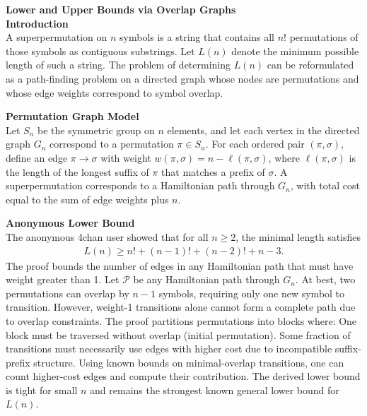 \begin{technical}
{\Large\textbf{Lower and Upper Bounds via Overlap Graphs}}\\

\noindent\textbf{Introduction}\\
A superpermutation on $n$ symbols is a string that contains all $n!$ permutations of those symbols as contiguous substrings. Let $L(n)$ denote the minimum possible length of such a string. The problem of determining $L(n)$ can be reformulated as a path-finding problem on a directed graph whose nodes are permutations and whose edge weights correspond to symbol overlap.

\noindent\textbf{Permutation Graph Model}\\
Let $S_n$ be the symmetric group on $n$ elements, and let each vertex in the directed graph $G_n$ correspond to a permutation $\pi \in S_n$. For each ordered pair $(\pi, \sigma)$, define an edge $\pi \rightarrow \sigma$ with weight $w(\pi, \sigma) = n - \ell(\pi, \sigma)$, where $\ell(\pi, \sigma)$ is the length of the longest suffix of $\pi$ that matches a prefix of $\sigma$. A superpermutation corresponds to a Hamiltonian path through $G_n$, with total cost equal to the sum of edge weights plus $n$.

\noindent\textbf{Anonymous Lower Bound}\\
The anonymous 4chan user showed that for all $n \geq 2$, the minimal length satisfies
\begin{align*}
L(n) \geq n! + (n-1)! + (n-2)! + n - 3.
\end{align*}
The proof bounds the number of edges in any Hamiltonian path that must have weight greater than 1. Let $\mathcal{P}$ be any Hamiltonian path through $G_n$. At best, two permutations can overlap by $n-1$ symbols, requiring only one new symbol to transition. However, weight-1 transitions alone cannot form a complete path due to overlap constraints. The proof partitions permutations into blocks where: One block must be traversed without overlap (initial permutation). Some fraction of transitions must necessarily use edges with higher cost due to incompatible suffix-prefix structure. Using known bounds on minimal-overlap transitions, one can count higher-cost edges and compute their contribution.
The derived lower bound is tight for small $n$ and remains the strongest known general lower bound for $L(n)$.


\end{technical}
